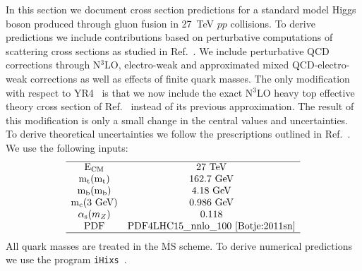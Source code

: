 \label{sec:he-lhc-ggF}
In this section we document cross section predictions for a standard
model Higgs boson produced through gluon fusion in 27~TeV $pp$ collisions.  To
derive predictions we include contributions based on perturbative
computations of scattering cross sections as studied in
Ref.~\cite{Anastasiou:2016cez}.  We include perturbative QCD
corrections through N$^3$LO, electro-weak and approximated mixed
QCD-electro-weak corrections as well as effects of finite quark
masses. The only modification with respect to YR4~\cite{deFlorian:2016spz} is that we
now include the exact N$^3$LO heavy top effective theory cross section of
Ref.~\cite{Mistlberger:2018etf} instead of its previous approximation. The
result of this modification is only a small change in the central values and
uncertainties. To derive theoretical uncertainties we follow the
prescriptions outlined in Ref.~\cite{Anastasiou:2016cez}.
We use the following inputs:
\begin{equation}
\begin{array}{c  c}
\hline
\text{E}_\text{CM} & 27~\text{TeV} \\
\text{m}_\text{t}(\text{m}_\text{t}) & 162.7~\text{GeV} \\
\text{m}_\text{b}(\text{m}_\text{b}) & 4.18~\text{GeV} \\
\text{m}_\text{c}(3 \text{ GeV}) & 0.986~\text{GeV} \\
\alpha_\text{s} (m_Z) & 0.118  \\
\text{PDF} & \text{PDF4LHC15\_nnlo\_100}\text{~\cite{Botje:2011sn}}\\
\hline
\end{array}
\end{equation}
All quark masses are treated in the $\overline{\text{MS}}$ scheme. To derive numerical predictions we use the program \texttt{iHixs}~\cite{Dulat:2018rbf}.

